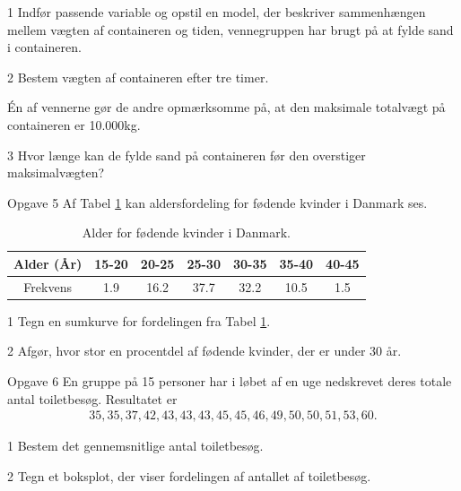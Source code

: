 \documentclass[12pt,x11names,a4paper]{article}
\begin{document}
\begin{delopgave}{}{1}
	Indfør passende variable og opstil en model, der beskriver sammenhængen mellem vægten af containeren og tiden, vennegruppen har brugt på at fylde sand i containeren. 
\end{delopgave}
\begin{delopgave}{}{2}
	Bestem vægten af containeren efter tre timer. 
\end{delopgave}
\begin{meretekst}
	Én af vennerne gør de andre opmærksomme på, at den maksimale totalvægt på containeren er 10.000kg.
\end{meretekst}
\begin{delopgave}{}{3}
	Hvor længe kan de fylde sand på containeren før den overstiger maksimalvægten?
\end{delopgave}
\begin{opgavetekst}{Opgave 5}
	Af Tabel \ref{tab:labour} kan aldersfordeling for fødende kvinder i Danmark ses.
	\begin{table}[H]
	\centering	
	\begin{tabular}{c|c|c|c|c|c|c}
		Alder (År) & 15-20 & 20-25 & 25-30 & 30-35 & 35-40 & 40-45\\
		\hline
		Frekvens & 1.9 & 16.2 & 37.7 & 32.2 & 10.5 & 1.5
	\end{tabular}
	\caption{Alder for fødende kvinder i Danmark.}
	\label{tab:labour}
	\end{table}
	\phantom{h}
\end{opgavetekst}
\begin{delopgave}{}{1}
	Tegn en sumkurve for fordelingen fra Tabel \ref{tab:labour}.
\end{delopgave}
\begin{delopgave}{}{2}
	Afgør, hvor stor en procentdel af fødende kvinder, der er under 30 år.
\end{delopgave}

\begin{opgavetekst}{Opgave 6}
	En gruppe på 15 personer har i løbet af en uge nedskrevet deres totale antal toiletbesøg. Resultatet er 
	\begin{align*}
		35,35,37,42,43,43,43,45,45,46,49,50,50,51,53,60.
	\end{align*}
\end{opgavetekst}
\begin{delopgave}{}{1}
	Bestem det gennemsnitlige antal toiletbesøg.
\end{delopgave}
\begin{delopgave}{}{2}
	Tegn et boksplot, der viser fordelingen af antallet af toiletbesøg. 
\end{delopgave}
\end{document}
